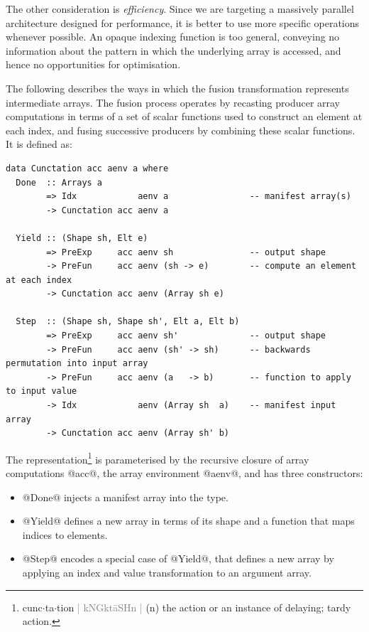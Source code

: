 The other consideration is \emph{efficiency}. Since we are targeting a massively
parallel architecture designed for performance, it is better to use more
specific operations whenever possible. An opaque indexing function is too
general, conveying no information about the pattern in which the underlying
array is accessed, and hence no opportunities for optimisation.

The following describes the ways in which the fusion transformation represents
intermediate arrays. The fusion process operates by recasting producer array
computations in terms of a set of scalar functions used to construct an element
at each index, %
and fusing successive producers by combining these scalar functions. It is
defined as:
%
\begin{lstlisting}[style=haskell
    ,label=lst:cunctation
    ,caption={Representation of fusible producer arrays}]
data Cunctation acc aenv a where
  Done  :: Arrays a
        => Idx            aenv a                -- manifest array(s)
        -> Cunctation acc aenv a

  Yield :: (Shape sh, Elt e)
        => PreExp     acc aenv sh               -- output shape
        -> PreFun     acc aenv (sh -> e)        -- compute an element at each index
        -> Cunctation acc aenv (Array sh e)

  Step  :: (Shape sh, Shape sh', Elt a, Elt b)
        => PreExp     acc aenv sh'              -- output shape
        -> PreFun     acc aenv (sh' -> sh)      -- backwards permutation into input array
        -> PreFun     acc aenv (a   -> b)       -- function to apply to input value
        -> Idx            aenv (Array sh  a)    -- manifest input array
        -> Cunctation acc aenv (Array sh' b)
\end{lstlisting}
%
\makeatchar
The representation\footnote{%
cunc$\cdot$ta$\cdot$tion
\textcolor{gray}{|
kNGk\textquotesingle t\={a}SHn
\enspace{}\textquotesingle {}
|} (n) the action or an instance of delaying; tardy action.}
\makeatactive
%
is parameterised by the recursive closure of array computations @acc@, the
array environment @aenv@, and has three constructors:
%
\begin{itemize}
\item @Done@ injects a manifest array into the type.

\item @Yield@ defines a new array in terms of its shape and a function
    that maps indices to elements.

\item @Step@ encodes a special case of @Yield@, that defines a new
    array by applying an index and value transformation to an argument array.

\end{itemize}

